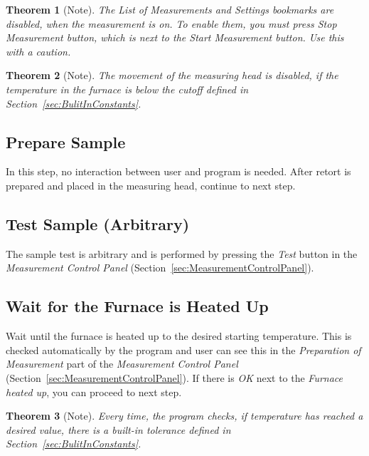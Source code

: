 \documentclass[a4paper,11pt,twoside]{book}
\theoremstyle{named}
\newtheorem*{namedtheorem}{Theorem}
\begin{document}
\begin{namedtheorem}[Note]
  The \textit{List of Measurements} and \textit{Settings} bookmarks are
  disabled, when the measurement is on. To enable them, you must press
  \textit{Stop Measurement} button, which is next to the \textit{Start
  Measurement} button. Use this with a caution.
\end{namedtheorem}

\begin{namedtheorem}[Note]
  The movement of the measuring head is disabled, if the temperature in the
  furnace is below the cutoff defined in Section~\ref{sec:BulitInConstants}.
\end{namedtheorem}

\subsection{Prepare Sample}
\label{sec:PrepareSample}

In this step, no interaction between user and program is needed. After retort is
prepared and placed in the measuring head, continue to next step.

\subsection{Test Sample (Arbitrary)}

The sample test is arbitrary and is performed by pressing the \textit{Test}
button in the \textit{Measurement Control Panel}
(Section~\ref{sec:MeasurementControlPanel}). 

\subsection{Wait for the Furnace is Heated Up}

Wait until the furnace is heated up to the desired starting temperature. This is
checked automatically by the program and user can see this in the
\textit{Preparation of Measurement} part of the \textit{Measurement Control
Panel} (Section~\ref{sec:MeasurementControlPanel}). If there is
\textit{OK} next to the \textit{Furnace heated up}, you can proceed to next
step.

\begin{namedtheorem}[Note]
  Every time, the program checks, if temperature has reached a desired value,
  there is a built-in tolerance defined in Section~\ref{sec:BulitInConstants}.
\end{namedtheorem}
\end{document}
